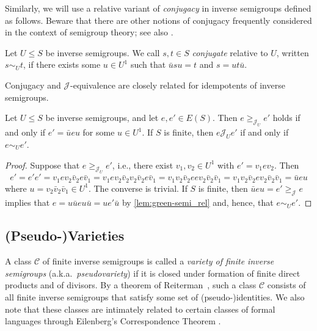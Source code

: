 \documentclass[anonymous,letter,UKenglish,cleveref,autoref,thm-restate]{lipics-v2021}
\renewcommand{\geq}{\geqslant}
\renewcommand{\leq}{\leqslant}
\newcommand*{\gJ}[1][]{\mathrel{\mathcal{J}_{#1}}}
\newcommand*{\gJge}[1][]{\geq_{\mathcal{J}_{#1}}}
\newcommand{\cC}{\mathcal{C}}
\theoremstyle{plain}
\theoremstyle{plain}
\begin{document}
Similarly, we will use a relative variant of \emph{conjugacy} in inverse semigroups defined as follows.
Beware that there are other notions of conjugacy frequently considered in the context of semigroup theory; see also \cite{AraujoKinyonKnieczny19,Jack23}.

\begin{definition}\label{def:conjugacy}
	Let $U \leq S$ be inverse semigroups.
  We call $s,t \in S$ \emph{conjugate} relative to $U$, written $s \sim_U t$, if there exists some $u \in U^1$ such that $\bar u s u = t$ and $s = u t \bar u$.
\end{definition}

Conjugacy and $\gJ$-equivalence are closely related for idempotents of inverse semigroups.

\begin{lemma}\label{lem:idem_conj_is_green_j}
	Let $U \leq S$ be inverse semigroups, and let $e, e' \in E(S)$.
	Then $e \gJge[U] e'$ holds if and only if $e' = \bar u e u$ for some $u \in U^1$.
	If $S$ is finite, then $e \gJ[U] e'$ if and only if $e \sim_U e'$.
\end{lemma}
\begin{proof}
	Suppose that $e \gJge[U] e'$, i.e., there exist $v_1, v_2 \in U^1$ with $e' = v_1 e v_2$.
	Then 
	\[
	e' = e'e' = v_1 e v_2 \bar v_2 e \bar v_1 = v_1 e v_2 \bar v_2 v_2 \bar v_2 e \bar v_1 = v_1 v_2 \bar v_2 e e v_2 \bar v_2 \bar v_1 = v_1 v_2 \bar v_2 e v_2 \bar v_2 \bar v_1 = \bar u e u
	\]
	where $u = v_2\bar v_2 \bar v_1 \in U^1$.
	The converse is trivial.
	If $S$ is finite, then $\bar u e u = e' \gJge e$ implies that $e = u \bar u e u \bar u = u e' \bar u$ by \cref{lem:green-semi_rel} and, hence, that $e \sim_U e'$.
\end{proof}


\subsection{(Pseudo-)Varieties}

A class $\cC$ of finite inverse semigroups is called a \emph{variety of finite inverse semigroups} (a.k.a.\ \emph{pseudovariety}) if it is closed under formation of finite direct products and of divisors.
By a theorem of Reiterman~\cite{rei82:short}, such a class $\cC$ consists of all finite inverse semigroups that satisfy some set of (pseudo-)identities.
We also note that these classes are intimately related to certain classes of formal languages through Eilenberg's Correspondence Theorem \cite{eil76}.
\end{document}
